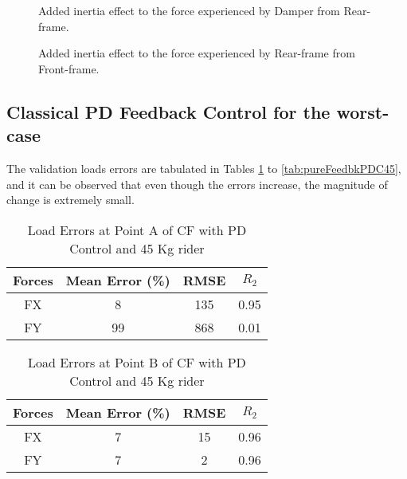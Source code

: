 \begin{figure}[h]
	\centering
	\scalebox{0.8}{
		\begin{tikzpicture}
			
	\end{tikzpicture}}
	\caption{Added inertia effect to the force experienced by Damper from Rear-frame.}
	\label{fig:Damper2Inert}
\end{figure}

\begin{figure}[h]
	\centering
	\scalebox{0.8}{
		\begin{tikzpicture}
			
	\end{tikzpicture}}
	\caption{Added inertia effect to the force experienced by Rear-frame from Front-frame.}
	\label{fig:RearFrameInert}
\end{figure}

\subsection*{Classical PD Feedback Control for the worst-case}
The validation loads errors are tabulated in Tables \ref{tab:pureFeedbkPDA45} to \ref{tab:pureFeedbkPDC45}, and it can be observed that even though the errors increase, the magnitude of change is extremely small.
\begin{table}[h!]
	\centering
	\begin{tabular}{ |c|c|c|c| } 
		\hline
		Forces & Mean Error (\%) & RMSE & $R_2$\\ 
		\hline
		FX & 8&135&0.95\\ 
		FY & 99&868&0.01 \\ 
		\hline
	\end{tabular}
	\caption{Load Errors at Point A of CF with PD Control and 45 Kg rider}
	\label{tab:pureFeedbkPDA45}
\end{table}

\begin{table}[h!]
	\centering
	\begin{tabular}{ |c|c|c|c| } 
		\hline
		Forces & Mean Error (\%) & RMSE & $R_2$\\ 
		\hline
		FX & 7&15&0.96\\ 
		FY & 7&2&0.96 \\ 
		\hline
	\end{tabular}
	\caption{Load Errors at Point B of CF with PD Control and 45 Kg rider}
	\label{tab:pureFeedbkPDB45}
\end{table}

